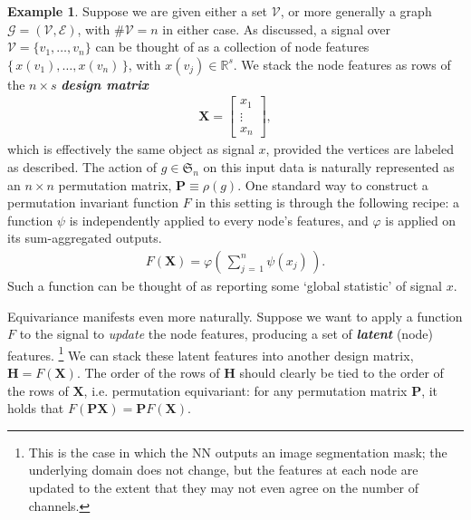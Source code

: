\documentclass[12pt]{article}
\numberwithin{equation}{section}
\theoremstyle{definition}
\newtheorem{eg}{Example}
\newcommand{		\eq		}[1]	{	\begin{align*}#1\end{align*}	}%
\newcommand{		\B		}	{\textbf					} %
\newcommand{		\1		}	{	\bm{1}					}%
\begin{document}



\begin{mdframed}
\begin{eg}
\label{eg:node_function_permutation}
Suppose we are given either a set $\mathcal{V}$, or more generally a graph $\mathcal{G} = ( \mathcal{V}, \mathcal{E} )$, with $\# \mathcal{V} = n$ in either case. As discussed, a signal over $\mathcal{V} = \{ v_1, \dots, v_n \}$ can be thought of as a collection of node features $\{ \, x(v_1), \dots, x(v_n) \, \}$, with $x(v_j) \in \mathbb{R}^s$. We stack the node features as rows of the $n \times s$ \emph{\B{design matrix}}
\eq{
\bm{X} = 
\left[ 
\begin{matrix}
x_1\\ 
\vdots\\
x_n
\end{matrix}
\right] ,
}
which is effectively the same object as signal $x$, provided the vertices are labeled as described. The action of $g \in \mathfrak{S}_n$ on this input data is naturally represented as an $n \times n$ permutation matrix, $\bm{P} \equiv \rho(g)$. One standard way to construct a permutation invariant function $F$ in this setting is through the following recipe: a function $\psi$ is independently applied to every node's features, and $\varphi$ is applied on its sum-aggregated outputs.
\eq{
    F( \bm{X}) = \varphi \left( \, \sum_{j \, = \, 1}^n \psi(x_j) \, \right) .
}
Such a function can be thought of as reporting some `global statistic' of signal $x$.

Equivariance manifests even more naturally. Suppose we want to apply a function $F$ to the signal to \emph{update} the node features, producing a set of \emph{\B{latent}} (node) features. \footnote{This is the case in which the NN outputs an image segmentation mask; the underlying domain does not change, but the features at each node are updated to the extent that they may not even agree on the number of channels. } We can stack these latent features into another design matrix, $\bm{H} = F(\bm{X})$. The order of the rows of $\bm{H}$ should clearly be tied to the order of the rows of $\bm{X}$, i.e. permutation equivariant: for any permutation matrix $\bm{P}$, it holds that $F(\bm{P} \bm{X} ) = \bm{P} F(\bm{X})$. 


\end{eg}
\end{mdframed}
\end{document}
